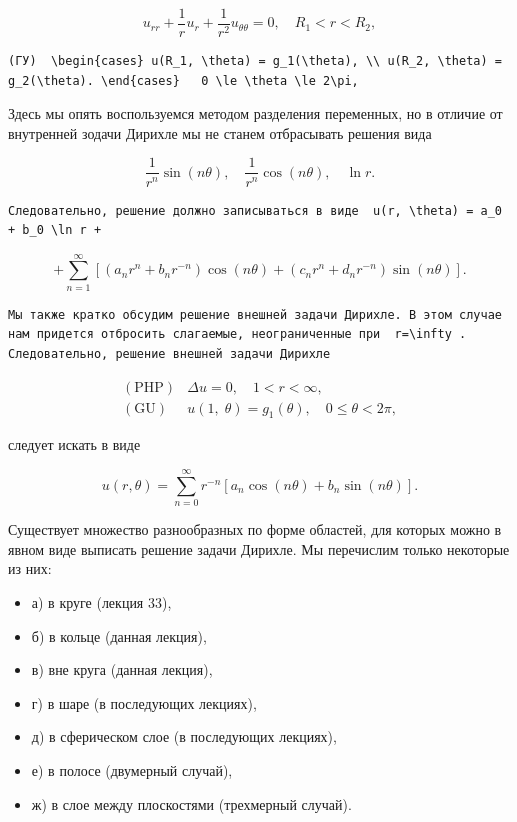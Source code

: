 \documentclass[
  ukrainian,
]{article}
\begin{document}
\[
u_{rr} + \frac{1}{r} u_r + \frac{1}{r^2} u_{\theta\theta} = 0, \quad R_1 < r < R_2,
\]

\begin{verbatim}
(ГУ)  \begin{cases} u(R_1, \theta) = g_1(\theta), \\ u(R_2, \theta) = g_2(\theta). \end{cases}   0 \le \theta \le 2\pi,
\end{verbatim}

Здесь мы опять воспользуемся методом разделения переменных, но в отличие
от внутренней зодачи Дирихле мы не станем отбрасывать решения вида

\[
\frac{1}{r^n}\sin{(n\theta)}, \quad \frac{1}{r^n}\cos{(n\theta)}, \quad \ln r.
\]

\begin{verbatim}
Следовательно, решение должно записываться в виде  u(r, \theta) = a_0 + b_0 \ln r +
\end{verbatim}

\[
+\sum_{n=1}^{\infty} \left[ (a_n r^n + b_n r^{-n}) \cos(n\theta) + (c_n r^n + d_n r^{-n}) \sin(n\theta) \right].
\]

\begin{verbatim}
Мы также кратко обсудим решение внешней задачи Дирихле. В этом случае нам придется отбросить слагаемые, неограниченные при  r=\infty . Следовательно, решение внешней задачи Дирихле
\end{verbatim}

\[
\begin{array}{ll} (\text{PHP}) & \Delta u = 0, \quad 1 < r < \infty, \\ (\text{GU}) & u\left(1, \; \theta\right) = g_1\left(\theta\right), \quad 0 \leqslant \theta < 2\pi, \end{array}
\]

следует искать в виде

\[
u(r, \theta) = \sum_{n=0}^{\infty} r^{-n} [a_n \cos(n\theta) + b_n \sin(n\theta)].
\]

Существует множество разнообразных по форме областей, для которых можно
в явном виде выписать решение задачи Дирихле. Мы перечислим только
некоторые из них:

\begin{itemize}
\item
  а) в круге (лекция 33),
\item
  б) в кольце (данная лекция),
\item
  в) вне круга (данная лекция),
\item
  г) в шаре (в последующих лекциях),
\item
  д) в сферическом слое (в последующих лекциях),
\item
  е) в полосе (двумерный случай),
\item
  ж) в слое между плоскостями (трехмерный случай).
\end{itemize}
\end{document}
